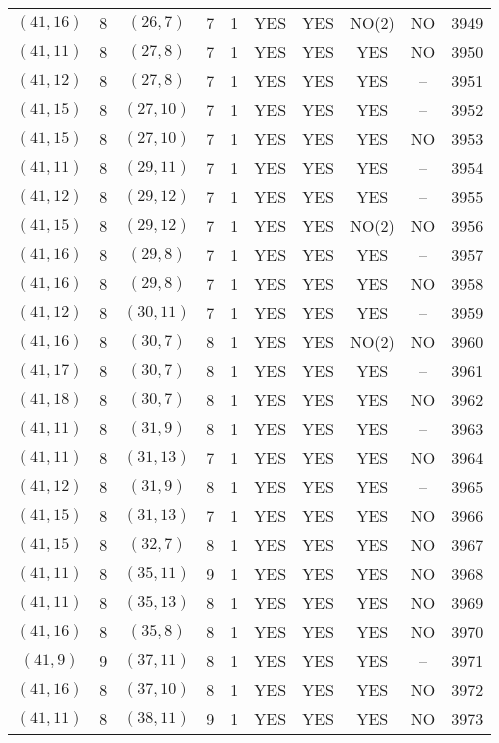 \begin{longtable}{|c|c|c|c|c|c|c|c|c|c|}
$(41, 16)$ & 8 & $(26, 7)$ & 7 & 1 & YES & YES & NO(2) & NO & 3949\\
$(41, 11)$ & 8 & $(27, 8)$ & 7 & 1 & YES & YES & YES & NO & 3950\\
$(41, 12)$ & 8 & $(27, 8)$ & 7 & 1 & YES & YES & YES & -- & 3951\\
$(41, 15)$ & 8 & $(27, 10)$ & 7 & 1 & YES & YES & YES & -- & 3952\\
$(41, 15)$ & 8 & $(27, 10)$ & 7 & 1 & YES & YES & YES & NO & 3953\\
$(41, 11)$ & 8 & $(29, 11)$ & 7 & 1 & YES & YES & YES & -- & 3954\\
$(41, 12)$ & 8 & $(29, 12)$ & 7 & 1 & YES & YES & YES & -- & 3955\\
$(41, 15)$ & 8 & $(29, 12)$ & 7 & 1 & YES & YES & NO(2) & NO & 3956\\
$(41, 16)$ & 8 & $(29, 8)$ & 7 & 1 & YES & YES & YES & -- & 3957\\
$(41, 16)$ & 8 & $(29, 8)$ & 7 & 1 & YES & YES & YES & NO & 3958\\
$(41, 12)$ & 8 & $(30, 11)$ & 7 & 1 & YES & YES & YES & -- & 3959\\
$(41, 16)$ & 8 & $(30, 7)$ & 8 & 1 & YES & YES & NO(2) & NO & 3960\\
$(41, 17)$ & 8 & $(30, 7)$ & 8 & 1 & YES & YES & YES & -- & 3961\\
$(41, 18)$ & 8 & $(30, 7)$ & 8 & 1 & YES & YES & YES & NO & 3962\\
$(41, 11)$ & 8 & $(31, 9)$ & 8 & 1 & YES & YES & YES & -- & 3963\\
$(41, 11)$ & 8 & $(31, 13)$ & 7 & 1 & YES & YES & YES & NO & 3964\\
$(41, 12)$ & 8 & $(31, 9)$ & 8 & 1 & YES & YES & YES & -- & 3965\\
$(41, 15)$ & 8 & $(31, 13)$ & 7 & 1 & YES & YES & YES & NO & 3966\\
$(41, 15)$ & 8 & $(32, 7)$ & 8 & 1 & YES & YES & YES & NO & 3967\\
$(41, 11)$ & 8 & $(35, 11)$ & 9 & 1 & YES & YES & YES & NO & 3968\\
$(41, 11)$ & 8 & $(35, 13)$ & 8 & 1 & YES & YES & YES & NO & 3969\\
$(41, 16)$ & 8 & $(35, 8)$ & 8 & 1 & YES & YES & YES & NO & 3970\\
$(41, 9)$ & 9 & $(37, 11)$ & 8 & 1 & YES & YES & YES & -- & 3971\\
$(41, 16)$ & 8 & $(37, 10)$ & 8 & 1 & YES & YES & YES & NO & 3972\\
$(41, 11)$ & 8 & $(38, 11)$ & 9 & 1 & YES & YES & YES & NO & 3973\\

\end{longtable}
